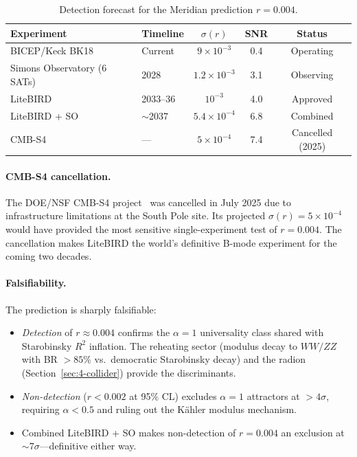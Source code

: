 \begin{table}[htbp]
\centering
\caption{Detection forecast for the Meridian prediction $r = 0.004$.}
\label{tab:4-bmode-forecast}
\small
\begin{tabular}{@{}llccc@{}}
\toprule
Experiment & Timeline & $\sigma(r)$ & SNR & Status \\
\midrule
BICEP/Keck BK18 & Current & $9 \times 10^{-3}$ & 0.4 & Operating \\
Simons Observatory (6 SATs) & 2028 & $1.2 \times 10^{-3}$ & 3.1 & Observing \\
LiteBIRD & 2033--36 & $10^{-3}$ & 4.0 & Approved \\
LiteBIRD + SO & $\sim$2037 & $5.4 \times 10^{-4}$ & 6.8 & Combined \\
CMB-S4 & --- & $5 \times 10^{-4}$ & 7.4 & Cancelled (2025) \\
\bottomrule
\end{tabular}
\end{table}

\paragraph{CMB-S4 cancellation.} The DOE/NSF CMB-S4 project~\cite{ch4:CMBS4} was cancelled in July 2025 due to infrastructure limitations at the South Pole site. Its projected $\sigma(r) = 5 \times 10^{-4}$ would have provided the most sensitive single-experiment test of $r = 0.004$. The cancellation makes LiteBIRD the world's definitive B-mode experiment for the coming two decades.

\paragraph{Falsifiability.} The prediction is sharply falsifiable:
\begin{itemize}
  \item \emph{Detection} of $r \approx 0.004$ confirms the $\alpha = 1$ universality class shared with Starobinsky $R^2$ inflation. The reheating sector (modulus decay to $WW/ZZ$ with BR $> 85\%$ vs.\ democratic Starobinsky decay) and the radion (Section~\ref{sec:4-collider}) provide the discriminants.
  \item \emph{Non-detection} ($r < 0.002$ at 95\% CL) excludes $\alpha = 1$ attractors at $> 4\sigma$, requiring $\alpha < 0.5$ and ruling out the K\"ahler modulus mechanism.
  \item Combined LiteBIRD + SO makes non-detection of $r = 0.004$ an exclusion at $\sim 7\sigma$---definitive either way.
\end{itemize}

